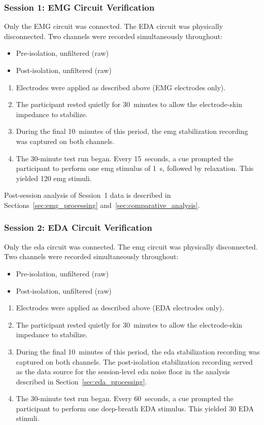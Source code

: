 \subsubsection{Session 1: EMG Circuit Verification} \label{sec:session1}
Only the EMG circuit was connected. The EDA circuit was physically disconnected. Two channels were recorded simultaneously throughout:
\begin{itemize}
    \item Pre-isolation, unfiltered (raw)
    \item Post-isolation, unfiltered (raw)
\end{itemize}

\begin{enumerate}
    \item Electrodes were applied as described above (EMG electrodes only).
    \item The participant rested quietly for 30~minutes to allow the electrode-skin impedance to stabilize.
    \item During the final 10~minutes of this period, the \gls{emg} stabilization recording was captured on both channels.
    \item The 30-minute test run began. Every 15~seconds, a cue prompted the participant to perform one \gls{emg} stimulus of \SI{1}{\second}, followed by relaxation. This yielded 120 \gls{emg} stimuli.
\end{enumerate}

Post-session analysis of Session~1 data is described in Sections~\ref{sec:emg_processing} and~\ref{sec:comparative_analysis}.

\subsubsection{Session 2: EDA Circuit Verification} \label{sec:session2}
Only the \gls{eda} circuit was connected. The \gls{emg} circuit was physically disconnected. Two channels were recorded simultaneously throughout:
\begin{itemize}
    \item Pre-isolation, unfiltered (raw)
    \item Post-isolation, unfiltered (raw)
\end{itemize}

\begin{enumerate}
    \item Electrodes were applied as described above (EDA electrodes only).
    \item The participant rested quietly for 30~minutes to allow the electrode-skin impedance to stabilize.
    \item During the final 10~minutes of this period, the \gls{eda} stabilization recording was captured on both channels. The post-isolation stabilization recording served as the data source for the session-level \gls{eda} noise floor in the analysis described in Section~\ref{sec:eda_processing}.
    \item The 30-minute test run began. Every 60~seconds, a cue prompted the participant to perform one deep-breath EDA stimulus. This yielded 30 EDA stimuli.
\end{enumerate}

